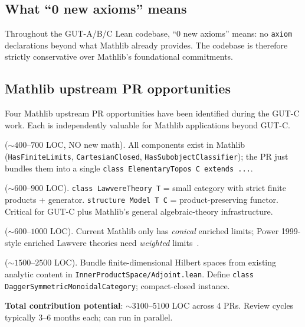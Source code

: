 \documentclass[11pt,a4paper]{article}
\theoremstyle{plain}
\theoremstyle{definition}
\theoremstyle{remark}
\newcommand{\cat}[1]{\mathbf{#1}}
\newcommand{\FdHilb}{\cat{FdHilb}}
\newcommand{\smcc}{SMCC}
\begin{document}
\subsection{What ``0 new axioms'' means}\label{sec:lean:axioms}

Throughout the GUT-A/B/C Lean codebase, ``0 new axioms'' means: no \texttt{axiom} declarations beyond what Mathlib already provides. The codebase is therefore strictly conservative over Mathlib's foundational commitments.

\subsection{Mathlib upstream PR opportunities}\label{sec:lean:prs}

Four Mathlib upstream PR opportunities have been identified during the GUT-C work. Each is independently valuable for Mathlib applications beyond GUT-C.

\begin{description}[leftmargin=*]
\item[PR-1: \texttt{ElementaryTopos} bundling] (${\sim}400$--$700$ LOC, NO new math). All components exist in Mathlib (\texttt{HasFiniteLimits}, \texttt{CartesianClosed}, \texttt{HasSubobjectClassifier}); the PR just bundles them into a single \texttt{class ElementaryTopos C extends ...}.

\item[PR-2: \texttt{LawvereTheory} + \texttt{Model} API] (${\sim}600$--$900$ LOC). \texttt{class LawvereTheory T} = small category with strict finite products + generator. \texttt{structure Model T C} = product-preserving functor. Critical for GUT-C plus Mathlib's general algebraic-theory infrastructure.

\item[PR-3: Weighted enriched limits] (${\sim}600$--$1000$ LOC). Current Mathlib only has \emph{conical} enriched limits; Power 1999-style enriched Lawvere theories need \emph{weighted} limits~\cite{Kel82}.

\item[PR-4: Dagger-\smcc{} + $\FdHilb$ scaffold] (${\sim}1500$--$2500$ LOC). Bundle finite-dimensional Hilbert spaces from existing analytic content in \texttt{InnerProductSpace/Adjoint.lean}. Define \texttt{class DaggerSymmetricMonoidalCategory}; compact-closed instance.
\end{description}

\textbf{Total contribution potential}: ${\sim}3100$--$5100$ LOC across 4 PRs. Review cycles typically 3--6 months each; can run in parallel.
\end{document}

